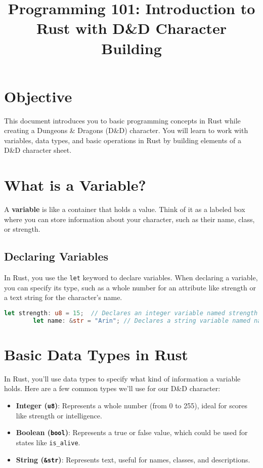 \documentclass{article}
\title{Programming 101: Introduction to Rust with D\&D Character Building}
\author{}
\date{}
\begin{document}
	
	\maketitle
	
	\section*{Objective}
	This document introduces you to basic programming concepts in Rust while creating a Dungeons \& Dragons (D\&D) character. You will learn to work with variables, data types, and basic operations in Rust by building elements of a D\&D character sheet.
	
	\section*{What is a Variable?}
	A \textbf{variable} is like a container that holds a value. Think of it as a labeled box where you can store information about your character, such as their name, class, or strength.
	
	\subsection*{Declaring Variables}
	In Rust, you use the \texttt{let} keyword to declare variables. When declaring a variable, you can specify its type, such as a whole number for an attribute like strength or a text string for the character’s name.
	
	\begin{lstlisting}[language=Rust]
		let strength: u8 = 15;  // Declares an integer variable named strength
		let name: &str = "Arin"; // Declares a string variable named name
	\end{lstlisting}
	
	\section*{Basic Data Types in Rust}
	In Rust, you’ll use data types to specify what kind of information a variable holds. Here are a few common types we’ll use for our D\&D character:
	
	\begin{itemize}
		\item \textbf{Integer (\texttt{u8})}: Represents a whole number (from 0 to 255), ideal for scores like strength or intelligence.
		\item \textbf{Boolean (\texttt{bool})}: Represents a true or false value, which could be used for states like \texttt{is\_alive}.
		\item \textbf{String (\texttt{\&str})}: Represents text, useful for names, classes, and descriptions.
	\end{itemize}
	
\end{document}
